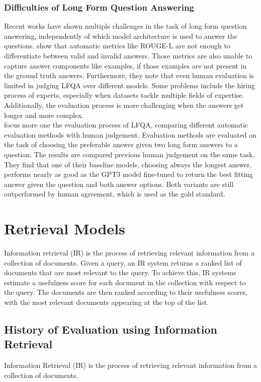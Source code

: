 \subsubsection{Difficulties of Long Form Question Answering}\label{free-form-qa-difficulties}
Recent works have shown multiple challenges in the task of long form question answering, independently of which model architecture is used to answer the questions.
\cite{krishna:2021} show that automatic metrics like ROUGE-L are not enough to differentiate between valid and invalid answers. 
Those metrics are also unable to capture answer components like examples, if those examples are not present in the ground truth answers. 
Furthermore, they note that even human evaluation is limited in judging LFQA over different models.
Some problems include the hiring process of experts, especially when datasets tackle multiple fields of expertise.
Additionally, the evaluation process is more challenging when the answers get longer and more complex.
\\
\cite{xu:2023} focus more one the evaluation process of LFQA, comparing different automatic evaluation methods with human judgement.
Evaluation methods are evaluated on the task of choosing the preferable answer given two long form answers to a question.
The results are compared previous human judgement on the same task.
They find that one of their baseline models, choosing always the longest answer, performs nearly as good as the GPT3 model fine-tuned to return the best fitting answer given the question and both answer options.
Both variants are still outperformed by human agreement, which is used as the gold standard.



\section{Retrieval Models}\label{retrieval-models}
Information retrieval (IR) is the process of retrieving relevant information from a collection of documents.
Given a query, an IR system returns a ranked list of documents that are most relevant to the query.
To achieve this, IR systems estimate a usefulness score for each document in the collection with respect to the query.
The documents are then ranked according to their usefulness scores, with the most relevant documents appearing at the top of the list.

\subsection{History of Evaluation using Information Retrieval}\label{history-of-evaluation-using-information-retrieval}
Information Retrieval (IR) is the process of retrieving relevant information from a collection of documents.


